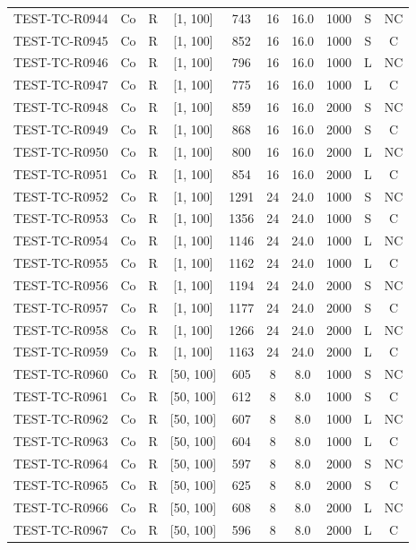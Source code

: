 \begin{longtable}{lccccccccc}
TEST-TC-R0944 & Co & R & [1, 100] & 743 & 16 & 16.0 & 1000 & S & NC \\
TEST-TC-R0945 & Co & R & [1, 100] & 852 & 16 & 16.0 & 1000 & S & C \\
TEST-TC-R0946 & Co & R & [1, 100] & 796 & 16 & 16.0 & 1000 & L & NC \\
TEST-TC-R0947 & Co & R & [1, 100] & 775 & 16 & 16.0 & 1000 & L & C \\
TEST-TC-R0948 & Co & R & [1, 100] & 859 & 16 & 16.0 & 2000 & S & NC \\
TEST-TC-R0949 & Co & R & [1, 100] & 868 & 16 & 16.0 & 2000 & S & C \\
TEST-TC-R0950 & Co & R & [1, 100] & 800 & 16 & 16.0 & 2000 & L & NC \\
TEST-TC-R0951 & Co & R & [1, 100] & 854 & 16 & 16.0 & 2000 & L & C \\
TEST-TC-R0952 & Co & R & [1, 100] & 1291 & 24 & 24.0 & 1000 & S & NC \\
TEST-TC-R0953 & Co & R & [1, 100] & 1356 & 24 & 24.0 & 1000 & S & C \\
TEST-TC-R0954 & Co & R & [1, 100] & 1146 & 24 & 24.0 & 1000 & L & NC \\
TEST-TC-R0955 & Co & R & [1, 100] & 1162 & 24 & 24.0 & 1000 & L & C \\
TEST-TC-R0956 & Co & R & [1, 100] & 1194 & 24 & 24.0 & 2000 & S & NC \\
TEST-TC-R0957 & Co & R & [1, 100] & 1177 & 24 & 24.0 & 2000 & S & C \\
TEST-TC-R0958 & Co & R & [1, 100] & 1266 & 24 & 24.0 & 2000 & L & NC \\
TEST-TC-R0959 & Co & R & [1, 100] & 1163 & 24 & 24.0 & 2000 & L & C \\
TEST-TC-R0960 & Co & R & [50, 100] & 605 & 8 & 8.0 & 1000 & S & NC \\
TEST-TC-R0961 & Co & R & [50, 100] & 612 & 8 & 8.0 & 1000 & S & C \\
TEST-TC-R0962 & Co & R & [50, 100] & 607 & 8 & 8.0 & 1000 & L & NC \\
TEST-TC-R0963 & Co & R & [50, 100] & 604 & 8 & 8.0 & 1000 & L & C \\
TEST-TC-R0964 & Co & R & [50, 100] & 597 & 8 & 8.0 & 2000 & S & NC \\
TEST-TC-R0965 & Co & R & [50, 100] & 625 & 8 & 8.0 & 2000 & S & C \\
TEST-TC-R0966 & Co & R & [50, 100] & 608 & 8 & 8.0 & 2000 & L & NC \\
TEST-TC-R0967 & Co & R & [50, 100] & 596 & 8 & 8.0 & 2000 & L & C \\

\end{longtable}
